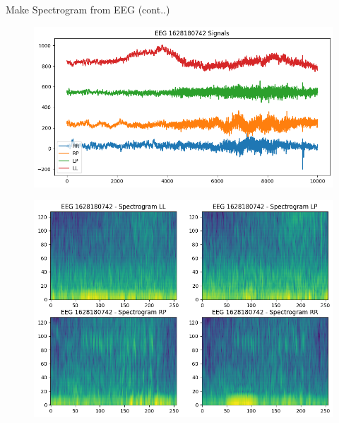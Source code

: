 \documentclass[leqno]{beamer}
\begin{document}


\begin{frame}{Make Spectrogram from EEG (cont..)}
\begin{figure}[tbp]
\centering
\vspace{-.5em}
\includegraphics[width=.5\textwidth]{EEG_Signal}
\end{figure}
\vspace{-1em}
\begin{figure}[tbp]
\centering
\includegraphics[width=.55\textwidth]{EEG_Spectrogram}
\end{figure}
\end{frame}















%
%
\end{document}
